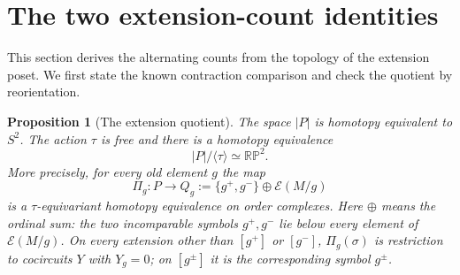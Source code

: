\documentclass[11pt]{article}
\newtheorem{proposition}[theorem]{Proposition}
\theoremstyle{definition}\newtheorem{definition}[theorem]{Definition}
\begin{document}
\section{The two extension-count identities}\label{sec:counts}
This section derives the alternating counts from the topology of the
extension poset. We first state the known contraction comparison and
check the quotient by reorientation.
\begin{proposition}[The extension quotient]\label{prop:extension-quotient}
The space $|P|$ is homotopy equivalent to $S^2$. The action $\tau$ is free and
there is a homotopy equivalence
\[
 |P|/\langle\tau\rangle\simeq\mathbb {RP}^{2}.
\]
More precisely, for every old element $g$ the map
\[
 \Pi_g:P\longrightarrow Q_g:=\{g^+,g^-\}\oplus\mathcal E(M/g)
\]
is a $\tau$-equivariant homotopy equivalence on order complexes. Here $\oplus$
means the ordinal sum: the two incomparable symbols $g^+,g^-$ lie below every
element of $\mathcal E(M/g)$. On every extension other than $[g^+]$ or $[g^-]$,
$\Pi_g(\sigma)$ is restriction to cocircuits $Y$ with $Y_g=0$; on $[g^\pm]$
it is the corresponding symbol $g^\pm$.
\end{proposition}
\end{document}
